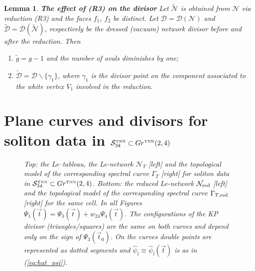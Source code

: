 \documentclass[11pt]{amsart}
\theoremstyle{plain}
\numberwithin{equation}{section}
\newtheorem{lemma}[theorem]{Lemma}
\begin{document}
\begin{lemma}\label{lemma:poles_red3}\textbf{The effect of  (R3) on the divisor}
Let ${\tilde{\mathcal N}}$ is obtained from ${\mathcal N}$ via reduction (R3) and the faces $f_1$, $f_2$ be distinct. 
Let ${\mathcal D}= {\mathcal D}({\mathcal N})$ and ${\tilde {\mathcal D}}= {\mathcal D}({\tilde {\mathcal N}})$, respectively be the dressed (vacuum) network divisor before and after the reduction. Then
\begin{enumerate}
\item ${\tilde g}=g-1$ and the number of ovals diminishes by one;
\item ${\tilde {\mathcal D}} = {\mathcal D}\backslash \{ \gamma_1 \}$, where
$\gamma_1$ is the divisor point on the component associated to the white vertex $V_1$ involved in the reduction.
\end{enumerate} 
\end{lemma}

\section{Plane curves and divisors for soliton data in ${\mathcal S}_{34}^{\mbox{\tiny TNN}}\subset Gr^{\mbox{\tiny TNN}}(2,4)$}\label{sec:example}

\begin{figure}
\caption{\small{\sl Top: the Le--tableau, the Le-network ${\mathcal N}_T$ [left] and the topological model of the corresponding spectral curve $\Gamma_T$ [right] for soliton data in ${\mathcal S}_{34}^{\mbox{\tiny TNN}}\subset Gr^{\mbox{\tiny TNN}}(2,4)$. Bottom: the reduced Le-network ${\mathcal N}_{\mbox{\scriptsize red}}$ [left] and the topological model of the corresponding spectral curve $\Gamma_{T,\mbox{\scriptsize red}}$ [right] for the same cell. In all Figures  $\Psi_{1} (\vec t)=\Psi_{3} (\vec t)+w_{24}\Psi_{4} (\vec t)$. The configurations of the KP divisor (triangles/squares) are the same on both curves and depend only on the sign of $\Psi_3 (\vec t_0)$.
On the curves double points are represented as dotted segments and $\hat \psi_l \equiv \hat\psi_l (\vec t)$ is as in (\ref{eq:hat_psi}).}} 
\label{fig:Gr24_net}
\end{figure}
\end{document}
